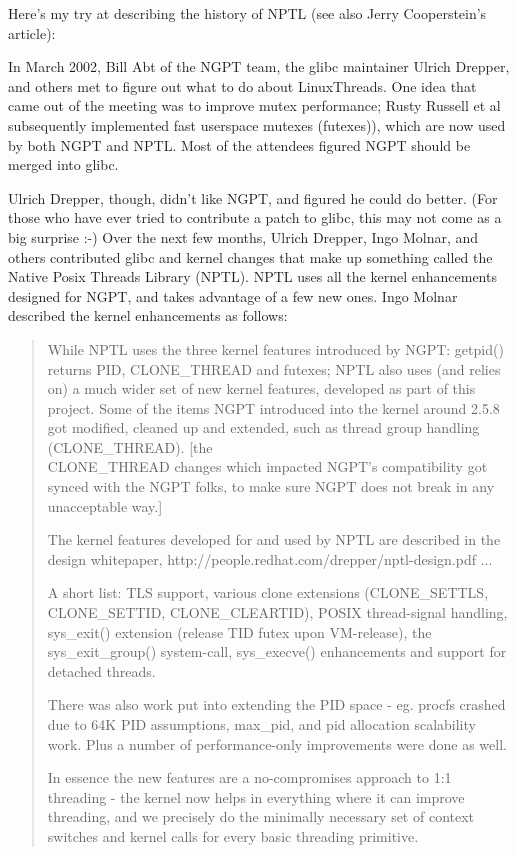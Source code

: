 \documentclass[12pt, twoside, a4paper, xetex]{report}
\begin{document}
Here's my try at describing the history of NPTL (see also Jerry Cooperstein's article):

In March 2002, Bill Abt of the NGPT team, the glibc maintainer Ulrich Drepper, and others met to figure out what to do about LinuxThreads. One idea that came out of the meeting was to improve mutex performance; Rusty Russell et al subsequently implemented fast userspace mutexes (futexes)), which are now used by both NGPT and NPTL. Most of the attendees figured NGPT should be merged into glibc.

Ulrich Drepper, though, didn't like NGPT, and figured he could do better. (For those who have ever tried to contribute a patch to glibc, this may not come as a big surprise :-) Over the next few months, Ulrich Drepper, Ingo Molnar, and others contributed glibc and kernel changes that make up something called the Native Posix Threads Library (NPTL). NPTL uses all the kernel enhancements designed for NGPT, and takes advantage of a few new ones. Ingo Molnar described the kernel enhancements as follows:

\begin{quotation}
While NPTL uses the three kernel features introduced by NGPT: getpid() returns PID, CLONE\_THREAD and futexes; NPTL also uses (and relies on) a much wider set of new kernel features, developed as part of this project.
Some of the items NGPT introduced into the kernel around 2.5.8 got modified, cleaned up and extended, such as thread group handling (CLONE\_THREAD). [the\\ CLONE\_THREAD changes which impacted NGPT's compatibility got synced with the NGPT folks, to make sure NGPT does not break in any unacceptable way.]

The kernel features developed for and used by NPTL are described in the design whitepaper, http://people.redhat.com/drepper/nptl-design.pdf ...

A short list: TLS support, various clone extensions (CLONE\_SETTLS, \\CLONE\_SETTID, CLONE\_CLEARTID), POSIX thread-signal handling, sys\_exit() extension (release TID futex upon VM-release), the sys\_exit\_group() system-call, sys\_execve() enhancements and support for detached threads.

There was also work put into extending the PID space - eg. procfs crashed due to 64K PID assumptions, max\_pid, and pid allocation scalability work. Plus a number of performance-only improvements were done as well.

In essence the new features are a no-compromises approach to 1:1 threading - the kernel now helps in everything where it can improve threading, and we precisely do the minimally necessary set of context switches and kernel calls for every basic threading primitive.
\end{quotation}
\end{document}
